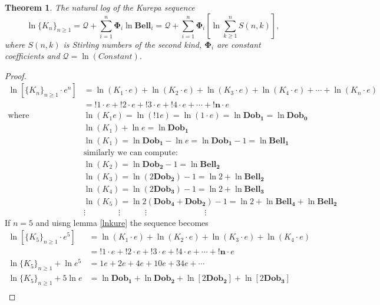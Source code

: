 \documentclass[pdflatex,sn-mathphys-num]{sn-jnl}%
\newtheorem{theorem}{Theorem}
\theoremstyle{thmstyleone}%
\theoremstyle{thmstyletwo}%
\theoremstyle{thmstylethree}%
\begin{document}
\begin{theorem}\label{lin}
    The natural log of the Kurepa sequence $$ \ln \lbrace K_n\rbrace_{n\geq 1}=\mathcal{Q}+\sum_{i=1}^{n}\mathbf{\Phi}_i \ln\mathbf{Bell}_i=\mathcal{Q}+\sum_{i=1}^{n}\mathbf{\Phi}_i\left[ \ln \sum_{k\geq 1}^{n} S(n,k)\right],$$ where $S(n,k)$ is Stirling numbers of the second kind, $\mathbf{\Phi}_i$ are constant coefficients and $\mathcal{Q}=\ln(Constant).$
\end{theorem}
\begin{proof}
\begin{align*}
 \ln[\lbrace K_n\rbrace_{n\geq 1}\cdotp e^n]&=\ln(K_1\cdotp e) + \ln(K_2 \cdotp e) + \ln(K_3 \cdotp e )+ \ln(K_4 \cdotp e) +\cdots + \ln (K_n \cdotp e)\\ 
&= !1\cdotp e +!2\cdotp e + !3\cdotp e + !4\cdotp e + \cdots + \mathbf{!n}\cdotp e\\ \mbox{where} \quad
&\ln{ (K_1e)}= \ln{(!1e)} = \ln{(1\cdotp e)} = \ln \mathbf{Dob_1}=\ln \mathbf{Dob_0}\\
&\ln{ (K_1)}+ \ln{ e}=\ln \mathbf{Dob_1}\\
&\ln{ (K_1)}= \ln \mathbf{Dob_1}-\ln{ e}= \ln \mathbf{Dob_1}-1= \ln{\mathbf{Bell_1}}\\
&\mbox{similarly we can compute: }\\
&\ln{ (K_2)}= \ln \mathbf{Dob_2}-1= \ln{\mathbf{Bell_2}}\\
&\ln{ (K_3)}= \ln{(2 \mathbf{Dob_2})}-1= \ln{2} + \ln{\mathbf{Bell_2}}\\
&\ln{ (K_4)}= \ln{(2 \mathbf{Dob_3})}-1= \ln{2} + \ln{\mathbf{Bell_3}}\\
&\ln{ (K_5)}= \ln{2 (\mathbf{Dob_4}+ \mathbf{Dob_2}) }-1= \ln{2} + \ln{\mathbf{Bell_4}}+ \ln{\mathbf{Bell_2}} \\
&\vdots \quad \quad \quad \quad \vdots \quad \quad \quad\vdots \quad \quad \quad \quad \quad \quad \quad\vdots \quad \quad
\end{align*}
If $n=5$ and uisng lemma \ref{lnkure} the sequence becomes
\begin{align*}
     \ln[\lbrace K_5\rbrace_{n\geq 1}\cdotp e^5]&=\ln(K_1\cdotp e) + \ln(K_2 \cdotp e) + \ln(K_3 \cdotp e )+ \ln(K_4 \cdotp e)\\ 
&= !1\cdotp e +!2\cdotp e + !3\cdotp e + !4\cdotp e + \cdots + \mathbf{!n}\cdotp e\\ 
 \ln \lbrace K_5\rbrace_{n\geq 1} + \ln e^5 &= 1 e + 2e + 4e + 10e+34e+ \cdots\\
 \ln \lbrace K_5\rbrace_{n\geq 1} + 5\ln e &= \ln \mathbf{Dob_1}+ \ln \mathbf{Dob_2}+  \ln[2\mathbf{Dob_2}] + \ln[2\mathbf{Dob_3}] \\

\end{align*}
\end{proof}
\end{document}
